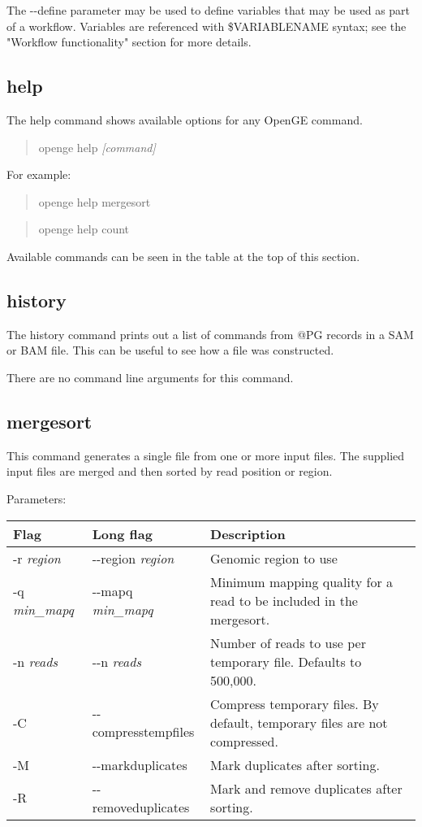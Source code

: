 \documentclass[11pt]{article}
\newcommand {\cmd}[1] {\begin{quote}#1\end{quote}}
\begin{document}
The {-}{-}define parameter may be used to define variables that may be used as part of a workflow. Variables are referenced with \$VARIABLENAME syntax; see the "Workflow functionality" section for more details.

\subsection {help}
The help command shows available options for any OpenGE command. 

\cmd{openge help \textit{[command]}}

For example:

\cmd{openge help mergesort}

\cmd{openge help count}

Available commands can be seen in the table at the top of this section.

\subsection {history}
The history command prints out a list of commands from @PG records in a SAM or BAM file. This can be useful to see how a file was constructed.

There are no command line arguments for this command.

\subsection {mergesort}
This command generates a single file from one or more input files. The supplied input files are merged and then sorted by read position or region.

Parameters:
\begin{center}
\begin{tabular}{llp{3.5in}}
\hline
Flag&Long flag&Description\\ \hline
-r \textit{region}&{-}{-}region \textit{region}&Genomic region to use\\
-q \textit{min\_mapq}&{-}{-}mapq \textit{min\_mapq}&Minimum mapping quality for a read to be included in the mergesort.\\
-n \textit{reads}&{-}{-}n \textit{reads}&Number of reads to use per temporary file. Defaults to 500,000.\\
-C&{-}{-}compresstempfiles&Compress temporary files. By default, temporary files are not compressed.\\
-M&{-}{-}markduplicates&Mark duplicates after sorting.\\
-R&{-}{-}removeduplicates&Mark and remove duplicates after sorting.\\
\end{tabular}
\end{center}
\end{document}
